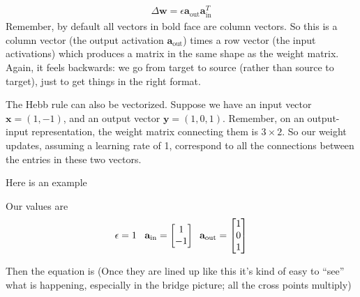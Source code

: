 \begin{eqnarray*}
\Delta \mathbf{w}  = \epsilon \mathbf{a}_{\text{out}} \mathbf{a}_{\text{in}} ^T
\end{eqnarray*}
Remember, by default all vectors in bold face are column vectors.  So this is a column vector (the output activation  $\mathbf{a}_{\text{out}}$) times a row vector (the input activations) which produces a matrix in the same shape as the weight matrix. Again, it feels backwards: we go from target to source (rather than source to target), just to get things in the right format.

The Hebb rule can also be vectorized. Suppose we have an input vector $\mathbf{x} = (1, -1)$, and an output vector $\mathbf{y} = (1,0,1)$. Remember, on an output-input representation, the weight matrix connecting them is $3 \times 2$. So our weight updates, assuming a learning rate of 1, correspond to all the connections between the entries in these two vectors. 

Here is an example


Our values are
\begin{equation*}
\epsilon = 1 \; \; \; \; \\
\mathbf{a}_{\text{in}} = \begin{bmatrix} 1 \\ -1 \end{bmatrix} \\ 
\; \; \mathbf{a}_{\text{out}} = \begin{bmatrix} 1 \\ 0 \\ 1 \end{bmatrix}
\end{equation*}

Then the equation is (Once they are lined up like this it's kind of easy to ``see'' what is happening, especially in the bridge picture; all the cross points multiply)

